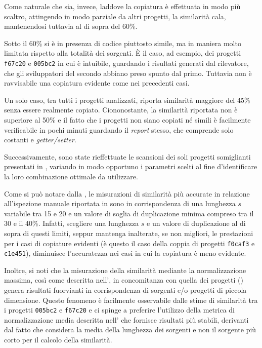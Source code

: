 Come naturale che sia, invece, laddove la copiatura è effettuata in modo più scaltro, attingendo in modo parziale da altri progetti, la similarità cala, mantenendosi tuttavia al di sopra del 60\%.

Sotto il 60\% si è in presenza di codice piuttosto simile, ma in maniera molto limitata rispetto alla totalità dei sorgenti.
%
\`E il caso, ad esempio, dei progetti \texttt{f67c20} e \texttt{005bc2} in cui è intuibile, guardando i risultati generati dal rilevatore, che gli sviluppatori del secondo abbiano preso spunto dal primo.
%
Tuttavia non è ravvisabile una copiatura evidente come nei precedenti casi.

Un solo caso, tra tutti i progetti analizzati, riporta similarità maggiore del 45\% senza essere realmente copiato.
%
Ciononostante, la similarità riportata non è superiore al 50\% e il fatto che i progetti non siano copiati né simili è facilmente verificabile in pochi minuti guardando il \textit{report} stesso, che comprende solo costanti e \textit{getter/setter}.

Successivamente, sono state rieffettuate le scansioni dei soli progetti somiglianti presentati in , variando in modo opportuno i parametri scelti al fine d'identificare la loro combinazione ottimale da utilizzare.

Come si può notare dalla , le misurazioni di similarità più accurate in relazione all'ispezione manuale riportata in  sono in corrispondenza di una lunghezza $s$ variabile tra 15 e 20 e un valore di soglia di duplicazione minima compreso tra il 30 e il 40\%.
%
Infatti, scegliere una lunghezza $s$ e un valore di duplicazione al di sopra di questi limiti, seppur mantenga inalterate, se non migliori, le prestazioni per i casi di copiature evidenti (è questo il caso della coppia di progetti \texttt{f0caf3} e \texttt{c1e451}), diminuisce l'accuratezza nei casi in cui la copiatura è meno evidente.

Inoltre, si noti che la misurazione della similarità mediante la normalizzazione massima, così come descritta nell', in concomitanza con quella dei progetti () genera risultati fuorvianti in corrispondenza di sorgenti e/o progetti di piccola dimensione.
%
Questo fenomeno è facilmente osservabile dalle stime di similarità tra i progetti \texttt{005bc2} e \texttt{f67c20} e ci spinge a preferire l'utilizzo della metrica di normalizzazione media descritta nell' che fornisce risultati più stabili, derivanti dal fatto che considera la media della lunghezza dei sorgenti e non il sorgente più corto per il calcolo della similarità.

